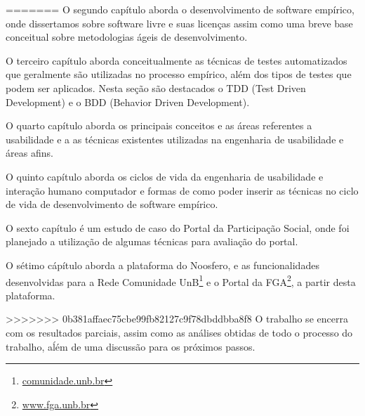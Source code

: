 =======
	O segundo capítulo aborda o desenvolvimento de software empírico, onde dissertamos sobre software livre 
	e suas licenças assim como uma breve base conceitual sobre metodologias ágeis de desenvolvimento.

	O terceiro capítulo aborda conceitualmente as técnicas de testes automatizados que geralmente
	são utilizadas no processo empírico, além dos tipos de testes que podem ser aplicados. Nesta seção são 
	destacados o TDD (Test Driven Development) e o BDD (Behavior Driven Development).

	O quarto capítulo aborda os principais conceitos e as áreas referentes a usabilidade e a as técnicas existentes utilizadas na engenharia de usabilidade e áreas afins.

	O quinto capítulo aborda os ciclos de vida da engenharia de usabilidade e interação humano computador e formas de como poder inserir as técnicas no ciclo de vida de desenvolvimento de software empírico.

	O sexto capítulo é um estudo de caso do Portal da Participação Social, onde foi planejado a utilização de algumas técnicas para avaliação do portal.

	O sétimo cápítulo aborda a plataforma do Noosfero, e as funcionalidades desenvolvidas para a Rede Comunidade UnB\footnote{\url{comunidade.unb.br}} e o Portal da FGA\footnote{\url{www.fga.unb.br}}, a partir desta plataforma.

>>>>>>> 0b381affaec75cbe99fb82127c9f78dbddbba8f8
	O trabalho se encerra com os resultados parciais, assim como as análises obtidas de todo o processo do trabalho, aĺém de uma discussão para os próximos passos.

	


